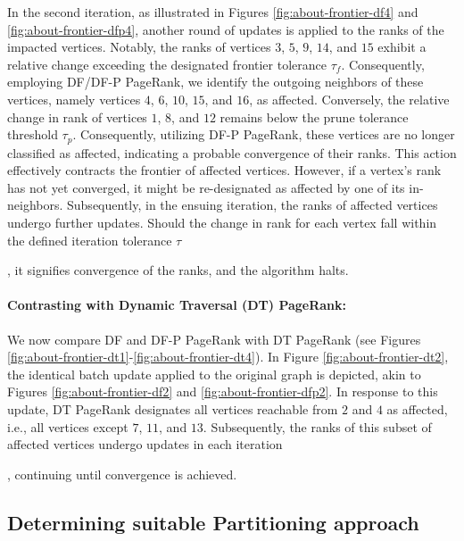 

In the second iteration, as illustrated in Figures \ref{fig:about-frontier-df4} and \ref{fig:about-frontier-dfp4}, another round of updates is applied to the ranks of the impacted vertices. Notably, the ranks of vertices $3$, $5$, $9$, $14$, and $15$ exhibit a relative change exceeding the designated frontier tolerance $\tau_f$. Consequently, employing DF/DF-P PageRank, we identify the outgoing neighbors of these vertices, namely vertices $4$, $6$, $10$, $15$, and $16$, as affected. Conversely, the relative change in rank of vertices $1$, $8$, and $12$ remains below the prune tolerance threshold $\tau_p$. Consequently, utilizing DF-P PageRank, these vertices are no longer classified as affected, indicating a probable convergence of their ranks. This action effectively contracts the frontier of affected vertices. However, if a vertex's rank has not yet converged, it might be re-designated as affected by one of its in-neighbors. Subsequently, in the ensuing iteration, the ranks of affected vertices undergo further updates. Should the change in rank for each vertex fall within the defined iteration tolerance $\tau$, it signifies convergence of the ranks, and the algorithm halts.

\paragraph{Contrasting with Dynamic Traversal (DT) PageRank:}

We now compare DF and DF-P PageRank with DT PageRank (see Figures \ref{fig:about-frontier-dt1}-\ref{fig:about-frontier-dt4}). In Figure \ref{fig:about-frontier-dt2}, the identical batch update applied to the original graph is depicted, akin to Figures \ref{fig:about-frontier-df2} and \ref{fig:about-frontier-dfp2}. In response to this update, DT PageRank designates all vertices reachable from $2$ and $4$ as affected, i.e., all vertices except $7$, $11$, and $13$. Subsequently, the ranks of this subset of affected vertices undergo updates in each iteration, continuing until convergence is achieved.





\subsection{Determining suitable Partitioning approach}
\label{sec:parition-determine}

